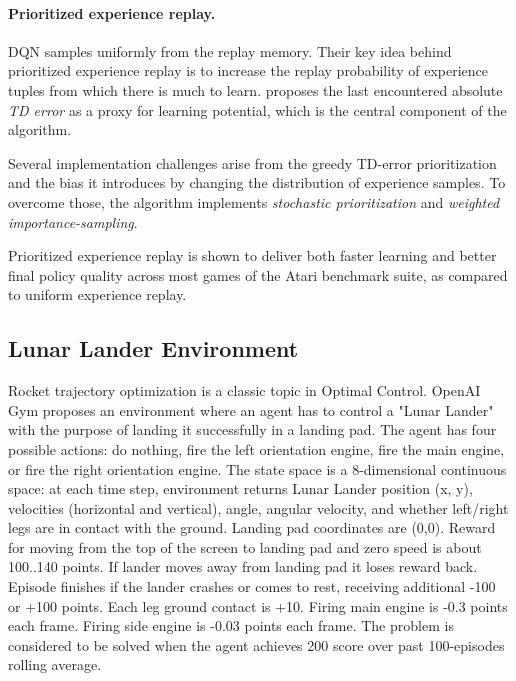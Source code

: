 \documentclass{article}
\begin{document}
    \paragraph{Prioritized experience replay.}
    DQN samples uniformly from the replay memory.
    Their key idea behind prioritized experience replay is to increase the replay probability of experience tuples from which there is much to learn.
    \cite{per} proposes the last encountered absolute \emph{TD error} as a proxy for learning potential, which is the central component of the algorithm.

    Several implementation challenges arise from the greedy TD-error prioritization and the bias it introduces by changing the distribution of experience samples.
    To overcome those, the algorithm implements \emph{stochastic prioritization} and \emph{weighted importance-sampling}.

    Prioritized experience replay is shown to deliver both faster learning and better final policy quality across most games of the Atari benchmark suite, as compared to uniform experience replay.

    \subsection{Lunar Lander Environment}
    \label{subsec:lunarlander}
    Rocket trajectory optimization is a classic topic in Optimal Control.
    OpenAI Gym proposes an environment where an agent has to control a "Lunar Lander" with the purpose of landing it successfully in a landing pad.
    The agent has four possible actions: do nothing, fire the left orientation engine, fire the main engine, or fire the right orientation engine.
    The state space is a 8-dimensional continuous space: at each time step, environment returns Lunar Lander position (x, y), velocities (horizontal and vertical), angle, angular velocity, and whether left/right legs are in contact with the ground.
    Landing pad coordinates are (0,0).
    Reward for moving from the top of the screen to landing pad and zero speed is about 100..140 points.
    If lander moves away from landing pad it loses reward back.
    Episode finishes if the lander crashes or comes to rest, receiving additional -100 or +100 points.
    Each leg ground contact is +10.
    Firing main engine is -0.3 points each frame.
    Firing side engine is -0.03 points each frame.
    The problem is considered to be solved when the agent achieves 200 score over past 100-episodes rolling average.
\end{document}
